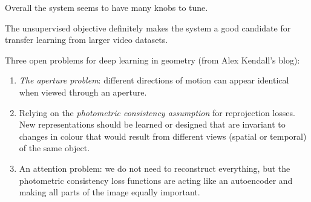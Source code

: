 \documentclass[a4paper, 12pt]{article}
\begin{document}
Overall the system seems to have many knobs to tune.

The unsupervised objective definitely makes the system a good candidate for
transfer learning from larger video datasets.

Three open problems for deep learning in geometry (from Alex Kendall's blog):

\begin{enumerate}
        \item \emph{The aperture problem}: different directions of motion can
                appear identical when viewed through an aperture.

        \item Relying on the \emph{photometric consistency assumption} for
                reprojection losses. New representations should be learned or
                designed that are invariant to changes in colour that would
                result from different views (spatial or temporal) of the same
                object.

        \item An attention problem: we do not need to reconstruct everything,
                but the photometric consistency loss functions are acting like
                an autoencoder and making all parts of the image equally
                important.
\end{enumerate}




\end{document}
